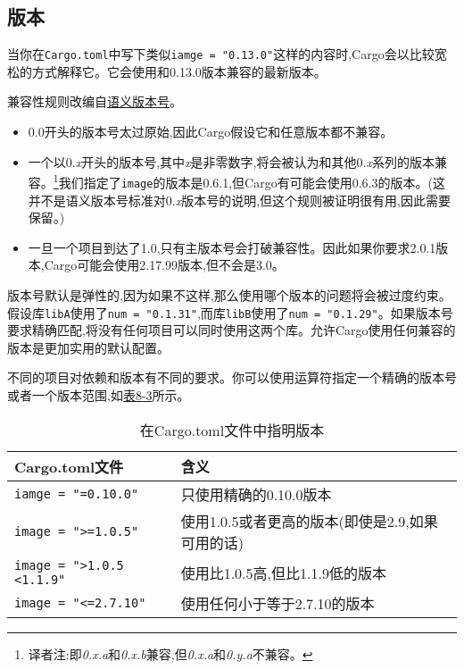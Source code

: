 \subsection{版本}
当你在\texttt{Cargo.toml}中写下类似\texttt{iamge = "0.13.0"}这样的内容时,Cargo会以比较宽松的方式解释它。它会使用和0.13.0版本兼容的最新版本。

兼容性规则改编自\href{https://semver.org/}{语义版本号}。

\begin{itemize}
    \item 0.0开头的版本号太过原始,因此Cargo假设它和任意版本都不兼容。
    \item 一个以0.\emph{x}开头的版本号,其中\emph{x}是非零数字,将会被认为和其他0.\emph{x}系列的版本兼容。\footnote{译者注:即\emph{0.x.a}和\emph{0.x.b}兼容,但\emph{0.x.a}和\emph{0.y.a}不兼容。}我们指定了\texttt{image}的版本是0.6.1,但Cargo有可能会使用0.6.3的版本。(这并不是语义版本号标准对0.\emph{x}版本号的说明,但这个规则被证明很有用,因此需要保留。)
    \item 一旦一个项目到达了1.0,只有主版本号会打破兼容性。因此如果你要求2.0.1版本,Cargo可能会使用2.17.99版本,但不会是3.0。
\end{itemize}

版本号默认是弹性的,因为如果不这样,那么使用哪个版本的问题将会被过度约束。假设库\texttt{libA}使用了\texttt{num = "0.1.31"},而库\texttt{libB}使用了\texttt{num = "0.1.29"}。如果版本号要求精确匹配,将没有任何项目可以同时使用这两个库。允许Cargo使用任何兼容的版本是更加实用的默认配置。

不同的项目对依赖和版本有不同的要求。你可以使用运算符指定一个精确的版本号或者一个版本范围,如\hyperref[t8-3]{表8-3}所示。

\begin{table}[htbp]
    \centering
    \caption{在Cargo.toml文件中指明版本}
    \label{t8-3}
    \begin{tabular}{p{}p{}}
        \hline
        \textbf{Cargo.toml文件} & \textbf{含义} \\
        \hline
        \texttt{iamge = "=0.10.0"}  & 只使用精确的0.10.0版本 \\
        \rowcolor{tablecolor}
        \texttt{image = ">=1.0.5"}  & 使用1.0.5或者更高的版本(即使是2.9,如果可用的话) \\
        \texttt{image = ">1.0.5 <1.1.9"} & 使用比1.0.5高,但比1.1.9低的版本 \\
        \rowcolor{tablecolor}
        \texttt{image = "<=2.7.10"} & 使用任何小于等于2.7.10的版本 \\
    \end{tabular}
\end{table}

